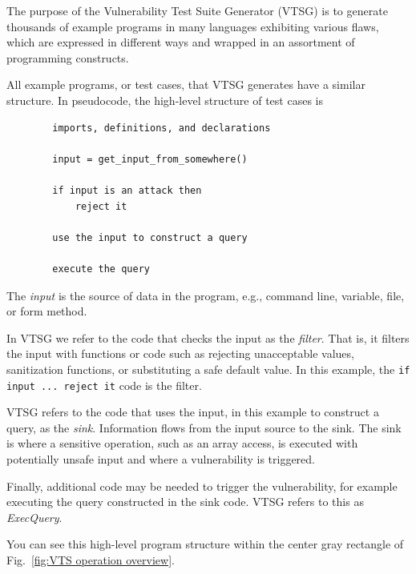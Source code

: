 The purpose of the Vulnerability Test Suite Generator (VTSG) is to generate
thousands of example programs in many languages exhibiting various flaws, which
are expressed in different ways and wrapped in an assortment of programming
constructs.

All example programs, or test cases, that VTSG generates have a similar structure.
In pseudocode, the high-level structure of test cases is
\begin{verbatim}
        imports, definitions, and declarations

        input = get_input_from_somewhere()

        if input is an attack then
            reject it

        use the input to construct a query

        execute the query
\end{verbatim}
The \emph{input} is the source of data in the program, e.g., command line, variable,
file,
or form method.

In VTSG we refer to the code that checks the input as the \emph{filter}.  That is, it
filters the input with functions or code such as rejecting unacceptable values,
sanitization functions, or substituting a safe default value.  In this example, the
\verb|if input ... reject it| code is the filter.

VTSG refers to the code that uses the input, in this example to construct a query, as
the \emph{sink}.  Information flows from the input source to the sink. The sink is where
a sensitive operation, such as an array access, is executed with potentially unsafe
input and where a vulnerability is triggered.

Finally, additional code may be needed to trigger the vulnerability, for example
executing the query constructed in the sink code.  VTSG refers to this as
\emph{ExecQuery}.

You can see this high-level program
structure within the center gray rectangle of Fig.~\ref{fig:VTS operation overview}.

